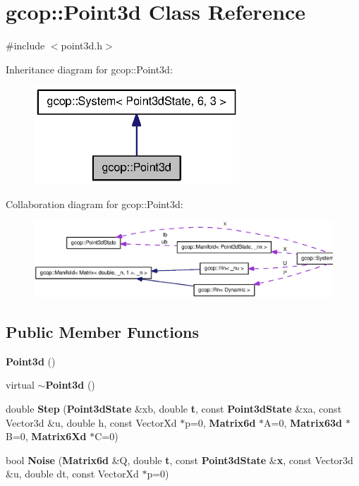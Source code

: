 \section{gcop\-:\-:\-Point3d \-Class \-Reference}
\label{classgcop_1_1Point3d}


{\ttfamily \#include $<$point3d.\-h$>$}



\-Inheritance diagram for gcop\-:\-:\-Point3d\-:
\nopagebreak
\begin{figure}[H]
\begin{center}
\leavevmode
\includegraphics[width=218pt]{classgcop_1_1Point3d__inherit__graph}
\end{center}
\end{figure}


\-Collaboration diagram for gcop\-:\-:\-Point3d\-:
\nopagebreak
\begin{figure}[H]
\begin{center}
\leavevmode
\includegraphics[width=350pt]{classgcop_1_1Point3d__coll__graph}
\end{center}
\end{figure}
\subsection*{\-Public \-Member \-Functions}
\begin{DoxyCompactItemize}
\item 
{\bf \-Point3d} ()
\item 
virtual {\bf $\sim$\-Point3d} ()
\item 
double {\bf \-Step} ({\bf \-Point3d\-State} \&xb, double {\bf t}, const {\bf \-Point3d\-State} \&xa, const \-Vector3d \&u, double h, const \-Vector\-Xd $\ast$p=0, {\bf \-Matrix6d} $\ast$\-A=0, {\bf \-Matrix63d} $\ast$\-B=0, {\bf \-Matrix6\-Xd} $\ast$\-C=0)
\item 
bool {\bf \-Noise} ({\bf \-Matrix6d} \&\-Q, double {\bf t}, const {\bf \-Point3d\-State} \&{\bf x}, const \-Vector3d \&u, double dt, const \-Vector\-Xd $\ast$p=0)
\end{DoxyCompactItemize}
